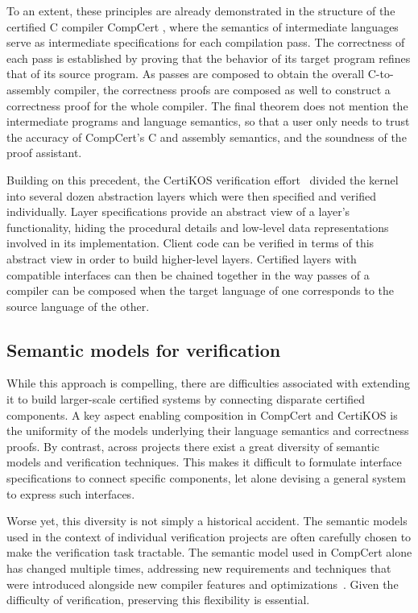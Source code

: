 \documentclass[sigplan,screen]{acmart}
\begin{document}
To an extent,
these principles are already demonstrated in the structure of the
certified C compiler CompCert \cite{compcert},
where the semantics of intermediate languages
serve as intermediate specifications for each compilation pass.
The correctness of each pass is established by
proving that the behavior of its target program
refines that of its source program.
As passes are composed to obtain the overall
C-to-assembly compiler,
the correctness proofs are composed as well
to construct a correctness proof for the whole compiler.
The final theorem does not mention the intermediate
programs and language semantics,
so that a user only needs to trust
the accuracy of CompCert's C and assembly semantics,
and the soundness of the proof assistant.

Building on this precedent,
the CertiKOS verification effort~\cite{popl15,ccal,osdi16}
divided the kernel into several dozen abstraction layers
which were then specified and verified individually.
Layer specifications provide
an abstract view of a layer's functionality,
hiding the procedural details and low-level data representations
involved in its implementation.
Client code can be verified in terms of
this abstract view
in order to build higher-level layers.
Certified layers
with compatible interfaces can then be chained together
in the way passes of a compiler
can be composed when the target language of one
corresponds to the source language of the other.


\subsection{Semantic models for verification} %
\label{ssec:semant}

While this approach is compelling,
there are difficulties associated with extending it
to build larger-scale certified systems
by connecting disparate certified components.
A key aspect enabling composition in CompCert and CertiKOS
is the uniformity of the models underlying
their language semantics and correctness proofs.
By contrast,
across projects
there exist a great diversity
of semantic models and verification techniques.
This makes it difficult to formulate
interface specifications to connect specific components,
let alone devising a general system
to express such interfaces.

Worse yet,
this diversity is not simply a historical accident.
The semantic models
used in the context of individual verification projects
are often carefully chosen
to make the verification task tractable.
The semantic model used in CompCert alone
has changed multiple times,
addressing new requirements and techniques
that were introduced alongside
new compiler features and optimizations~\cite{compsem}.
Given the difficulty of verification,
preserving this flexibility is essential.
\end{document}
